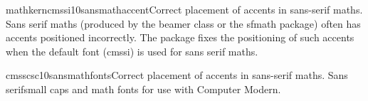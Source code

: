 \documentclass{ddltxtyp}
\begin{document}

\begin{package}{mathkerncmssi10}{sansmathaccent}{Correct placement of accents in sans-serif maths.}
Sans serif maths (produced by the beamer class or the sfmath
package) often has accents positioned incorrectly. The package
fixes the positioning of such accents when the default font
(cmssi) is used for sans serif maths.
\end{package}

\begin{package}{cmsscsc10}{sansmathfonts}{Correct placement of accents in sans-serif maths.}
Sans serifsmall caps and math fonts for use with Computer
Modern.
\end{package}
\end{document}
